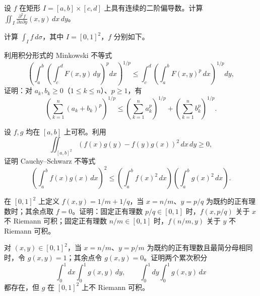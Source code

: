 \noindent\begin{minipage}{\textwidth}
设 $f$ 在矩形 $I=[a,b]\times[c,d]$ 上具有连续的二阶偏导数。计算 $\iint_I\frac{\partial^2f}{\partial x\partial y}(x,y)\,dx\,dy$。
\end{minipage}\par\vfill
\newpage
\noindent\begin{minipage}{\textwidth}
计算 $\int_I f\,d\sigma$，其中 $I=[0,1]^2$，$f$ 分别如下。
\end{minipage}\par\vfill
\noindent\begin{minipage}{\textwidth}
利用积分形式的 Minkowski 不等式\[\left(\int_a^b\left(\int_c^dF(x,y)\,dy\right)^pdx\right)^{1/p}\le\int_c^d\left(\int_a^bF(x,y)^p\,dx\right)^{1/p}dy,\]证明：对 $a_k,b_k\ge0$（$1\le k\le n$）、$p\ge1$，有\[\left(\sum_{k=1}^n(a_k+b_k)^p\right)^{1/p}\le\left(\sum_{k=1}^na_k^p\right)^{1/p}+\left(\sum_{k=1}^nb_k^p\right)^{1/p}.\]
\end{minipage}\par\vfill
\noindent\begin{minipage}{\textwidth}
设 $f,g$ 均在 $[a,b]$ 上可积。利用\[\iint_{[a,b]^2}(f(x)g(y)-f(y)g(x))^2\,dx\,dy\ge0,\]证明 Cauchy--Schwarz 不等式\[\left(\int_a^bf(x)g(x)\,dx\right)^2\le\left(\int_a^bf(x)^2\,dx\right)\left(\int_a^bg(x)^2\,dx\right).\]
\end{minipage}\par\vfill
\newpage
\noindent\begin{minipage}{\textwidth}
在 $[0,1]^2$ 上定义 $f(x,y)=1/m+1/q$，当 $x=n/m$、$y=p/q$ 为既约的正有理数时；其余点取 $f=0$。证明：固定正有理数 $p/q\in[0,1]$ 时，$f(x,p/q)$ 关于 $x$ 不 Riemann 可积；固定正有理数 $n/m\in[0,1]$ 时，$f(n/m,y)$ 关于 $y$ 不 Riemann 可积。
\end{minipage}\par\vfill
\noindent\begin{minipage}{\textwidth}
对 $(x,y)\in[0,1]^2$，当 $x=n/m$、$y=p/m$ 为既约的正有理数且最简分母相同时，令 $g(x,y)=1$；其余点令 $g(x,y)=0$。证明两个累次积分\[\int_0^1dx\int_0^1g(x,y)\,dy,\qquad\int_0^1dy\int_0^1g(x,y)\,dx\]都存在，但 $g$ 在 $[0,1]^2$ 上不 Riemann 可积。
\end{minipage}\par\vfill

